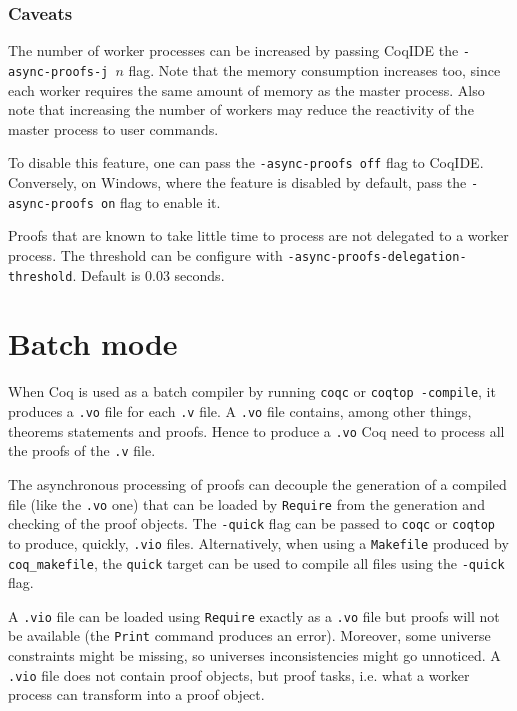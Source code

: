 \subsubsection{Caveats}
\label{interactivecaveats}

The number of worker processes can be increased by passing CoqIDE the
\texttt{-async-proofs-j $n$} flag.  Note that the memory consumption
increases too, since each worker requires the same amount of memory as
the master process. Also note that increasing the number of workers may
reduce the reactivity of the master process to user commands.

To disable this feature, one can pass the \texttt{-async-proofs off} flag to
CoqIDE. Conversely, on Windows, where the feature is disabled by default,
pass the \texttt{-async-proofs on} flag to enable it.

Proofs that are known to take little time to process are not delegated to a
worker process.  The threshold can be configure with \texttt{-async-proofs-delegation-threshold}.  Default is 0.03 seconds.

\section{Batch mode}

When Coq is used as a batch compiler by running \texttt{coqc} or
\texttt{coqtop -compile}, it produces a \texttt{.vo} file for each
\texttt{.v} file. A \texttt{.vo} file contains, among other things,
theorems statements and proofs. Hence to produce a \texttt{.vo} Coq need
to process all the proofs of the \texttt{.v} file.

The asynchronous processing of proofs can decouple the generation of a
compiled file (like the \texttt{.vo} one) that can be loaded by
\texttt{Require} from the generation and checking of the proof objects.
The \texttt{-quick} flag can be passed to \texttt{coqc} or
\texttt{coqtop} to produce, quickly, \texttt{.vio} files. Alternatively,
when using a \texttt{Makefile} produced by \texttt{coq\_makefile}, the
\texttt{quick} target can be used to compile all files using the
\texttt{-quick} flag.

A \texttt{.vio} file can be loaded using \texttt{Require} exactly as a
\texttt{.vo} file but proofs will not be available (the \texttt{Print}
command produces an error). Moreover, some universe constraints might be
missing, so universes inconsistencies might go unnoticed. A
\texttt{.vio} file does not contain proof objects, but proof tasks,
i.e. what a worker process can transform into a proof object.

